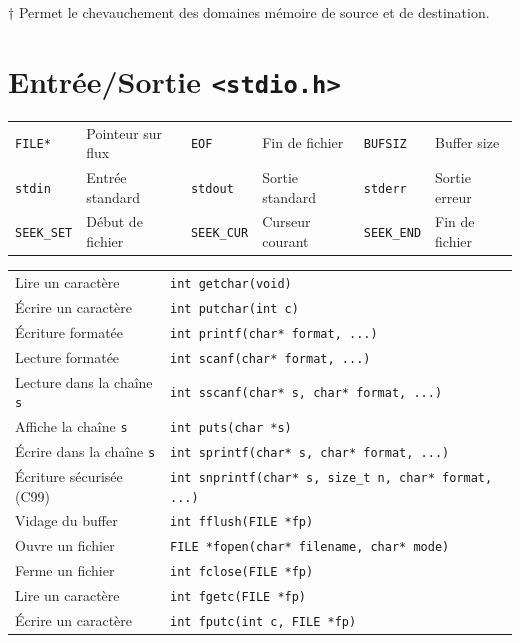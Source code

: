 \documentclass{article}
\newcommand{\cd}{\lstinline}
\begin{document}
\begin{multicols*}{3}
$\dagger$ Permet le chevauchement des domaines mémoire de source et de destination.

\section*{Entrée/Sortie \texttt{<stdio.h>}}

\begin{tabularx}{\linewidth}{
  >{\hsize=0.5\hsize}X%
  >{\hsize=0.9\hsize}X%
  >{\hsize=0.5\hsize}X%
  >{\hsize=0.9\hsize}X%
  >{\hsize=0.5\hsize}X%
  >{\hsize=0.9\hsize}X%
  }

  \cd{FILE*}  & Pointeur sur flux &
  \cd{EOF}    & Fin de fichier &
  \cd{BUFSIZ} & Buffer size \\

  \cd{stdin}  & Entrée standard &
  \cd{stdout} & Sortie standard &
  \cd{stderr} & Sortie erreur \\

  \cd{SEEK_SET} & Début de fichier &
  \cd{SEEK_CUR} & Curseur courant &
  \cd{SEEK_END} & Fin de fichier \\
\end{tabularx}

\begin{tabularx}{\linewidth}{Xl}
  Lire un caractère & \cd{int getchar(void)} \rule{0pt}{3ex} \\
  Écrire un caractère & \cd{int putchar(int c)} \\
  Écriture formatée & \cd{int printf(char* format, ...)} \\
  Lecture formatée & \cd{int scanf(char* format, ...)} \\
  Lecture dans la chaîne \texttt{s} & \cd{int sscanf(char* s, char* format, ...)} \\
  Affiche la chaîne \texttt{s} & \cd{int puts(char *s)} \\
  Écrire dans la chaîne \texttt{s} & \cd{int sprintf(char* s, char* format, ...)}  \\
  Écriture sécurisée (C99) & \cd{int snprintf(char* s, size_t n, char* format, ...)} \\
  Vidage du buffer & \cd{int fflush(FILE *fp)} \\
  Ouvre un fichier & \cd{FILE *fopen(char* filename, char* mode)} \\
  Ferme un fichier & \cd{int fclose(FILE *fp)} \\
  Lire un caractère & \cd{int fgetc(FILE *fp)} \\
  Écrire un caractère & \cd{int fputc(int c, FILE *fp)} \\


\end{tabularx}
\end{multicols*}
\end{document}
